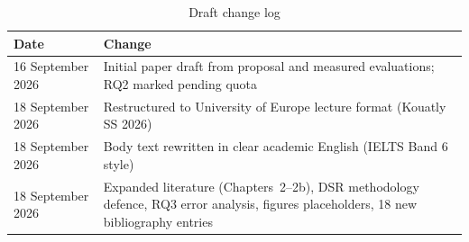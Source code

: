 \begin{table}[ht]
\centering
\caption{Draft change log}
\label{tab:changelog}
\begin{tabularx}{\textwidth}{@{}lX@{}}
\toprule
\textbf{Date} & \textbf{Change} \\
\midrule
16 September 2026 & Initial paper draft from proposal and measured evaluations; RQ2 marked pending quota \\
18 September 2026 & Restructured to University of Europe lecture format (Kouatly SS 2026) \\
18 September 2026 & Body text rewritten in clear academic English (IELTS Band 6 style) \\
18 September 2026 & Expanded literature (Chapters~2--2b), DSR methodology defence, RQ3 error analysis, figures placeholders, 18 new bibliography entries \\
\bottomrule
\end{tabularx}
\end{table}
